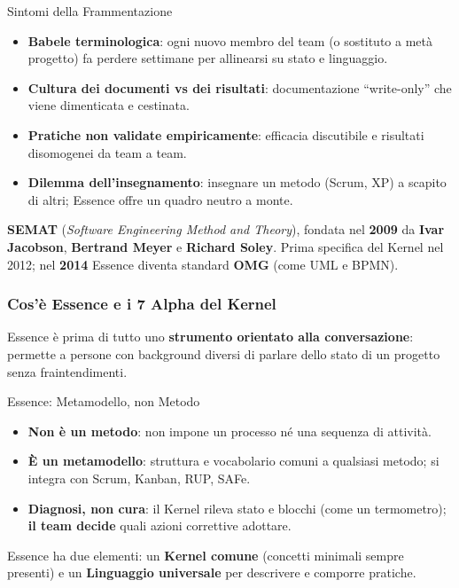 \documentclass[12pt]{extarticle}
\begin{document}
\begin{cbox}{Sintomi della Frammentazione}
\begin{itemize}
    \item \textbf{Babele terminologica}: ogni nuovo membro del team (o sostituto a metà progetto) fa perdere settimane per allinearsi su stato e linguaggio.
    \item \textbf{Cultura dei documenti vs dei risultati}: documentazione ``write-only'' che viene dimenticata e cestinata.
    \item \textbf{Pratiche non validate empiricamente}: efficacia discutibile e risultati disomogenei da team a team.
    \item \textbf{Dilemma dell'insegnamento}: insegnare un metodo (Scrum, XP) a scapito di altri; Essence offre un quadro neutro a monte.
\end{itemize}
\end{cbox}

\noindent \textbf{SEMAT} (\textit{Software Engineering Method and Theory}), fondata nel \textbf{2009} da \textbf{Ivar Jacobson}, \textbf{Bertrand Meyer} e \textbf{Richard Soley}. Prima specifica del Kernel nel 2012; nel \textbf{2014} Essence diventa standard \textbf{OMG} (come UML e BPMN).

\subsubsection{Cos'è Essence e i 7 Alpha del Kernel}
\noindent Essence è prima di tutto uno \textbf{strumento orientato alla conversazione}: permette a persone con background diversi di parlare dello stato di un progetto senza fraintendimenti.

\begin{cbox}{Essence: Metamodello, non Metodo}
\begin{itemize}
    \item \textbf{Non è un metodo}: non impone un processo né una sequenza di attività.
    \item \textbf{È un metamodello}: struttura e vocabolario comuni a qualsiasi metodo; si integra con Scrum, Kanban, RUP, SAFe.
    \item \textbf{Diagnosi, non cura}: il Kernel rileva stato e blocchi (come un termometro); \textbf{il team decide} quali azioni correttive adottare.
\end{itemize}
\end{cbox}

\noindent Essence ha due elementi: un \textbf{Kernel comune} (concetti minimali sempre presenti) e un \textbf{Linguaggio universale} per descrivere e comporre pratiche.
\end{document}
